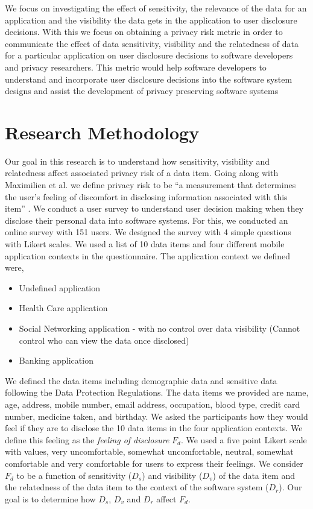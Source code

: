 \documentclass[conference]{IEEEtran}
\begin{document}
We focus on investigating the effect of sensitivity, the relevance of the data for an application and the visibility the data gets in the application to user disclosure decisions. With this we focus on obtaining a privacy risk metric in order to communicate the effect of data sensitivity, visibility and the relatedness of data for a particular application on user disclosure decisions to software developers and privacy researchers. This metric would help software developers to understand and incorporate user disclosure decisions into the software system designs and assist the development of privacy preserving software systems


\section {Research Methodology}

Our goal in this research is to understand how sensitivity, visibility and relatedness affect associated privacy risk of a data item. Going along with Maximilien et al. we define privacy risk to be \enquote{a measurement that determines the user's feeling of discomfort in disclosing information associated with this item} \cite {maximilien2009privacy}. We conduct a user survey to understand user decision making when they disclose their personal data into software systems. For this, we conducted an online survey with 151 users. We designed the survey with 4 simple questions with Likert scales. We used a list of 10 data items and four different mobile application contexts in the questionnaire. The application context we defined were,

\begin{itemize}
\item Undefined application
\item Health Care application
\item Social Networking application - with no control over data visibility (Cannot control who can view the data once disclosed)
\item Banking application
\end{itemize}

We defined the data items including demographic data and sensitive data following the Data Protection Regulations. The data items we provided are name, age, address, mobile number, email address, occupation, blood type, credit card number, medicine taken, and birthday. We asked the participants how they would feel if they are to disclose the 10 data items in the four application contexts. We define this feeling as the \textit{feeling of disclosure} $F_d$. We used a five point Likert scale with values, very uncomfortable, somewhat uncomfortable, neutral, somewhat comfortable and very comfortable for users to express their feelings. We consider $F_d$ to be a function of sensitivity ($D_s$) and visibility ($D_v$) of the data item and the relatedness of the data item to the context of the software system ($D_r$). Our goal is to determine how $D_s$, $D_v$ and $D_r$ affect $F_d$.
\end{document}
